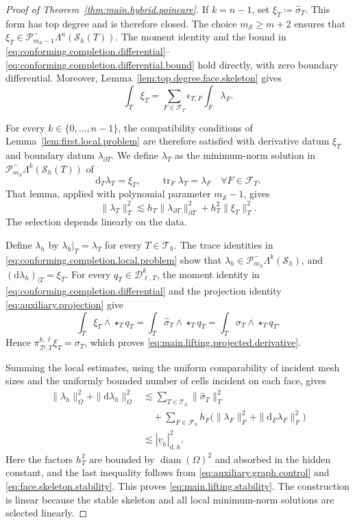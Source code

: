 \documentclass[a4paper,11pt]{article}
\theoremstyle{definition}
\newcommand{\DIFF}{\mathrm{d}}
\newcommand{\Sh}{\mathcal{S}_h}
\newcommand{\PLtrim}[2]{\mathcal{P}_{#1}^{-}\Lambda^{#2}}
\newcommand{\Dpoly}[2]{\mathcal D_{\ell,#1}^{#2}}
\newcommand{\piD}[2]{\pi_{\mathcal D,#1}^{#2,\ell}}
\newcommand{\trc}{\operatorname{tr}}
\newcommand{\epsTF}{\epsilon_{T,F}}
\begin{document}
\begin{proof}[Proof of Theorem~\ref{thm:main.hybrid.poincare}]
If $k=n-1$, set $\xi_T\coloneqq\widehat\sigma_T$.
This form has top degree and is therefore closed.
The choice $m_{\mathcal S}\geq m+2$ ensures that $\xi_T\in\PLtrim{m_{\mathcal S}-1}{n}(\Sh(T))$.
The moment identity and the bound in \eqref{eq:conforming.completion.differential}--\eqref{eq:conforming.completion.differential.bound} hold directly, with zero boundary differential.
Moreover, Lemma~\ref{lem:top.degree.face.skeleton} gives
\[
  \int_T\xi_T
  =
  \sum_{F\in\mathcal F_T}\epsTF\int_F\lambda_F.
\]

For every $k\in\{0,\ldots,n-1\}$, the compatibility conditions of Lemma~\ref{lem:first.local.problem} are therefore satisfied with derivative datum $\xi_T$ and boundary datum $\lambda_{\partial T}$.
We define $\lambda_T$ as the minimum-norm solution in $\PLtrim{m_{\mathcal S}}{k}(\Sh(T))$ of
\begin{equation}\label{eq:conforming.completion.local.problem}
  \DIFF_T\lambda_T=\xi_T,
  \qquad
  \trc_F\lambda_T=\lambda_F
  \quad\forall F\in\mathcal F_T.
\end{equation}
That lemma, applied with polynomial parameter $m_{\mathcal S}-1$, gives
\[
  \|\lambda_T\|_T^2
  \lesssim
  h_T\|\lambda_{\partial T}\|_{\partial T}^2
  +
  h_T^2\|\xi_T\|_T^2.
\]
The selection depends linearly on the data.

Define $\lambda_h$ by $\left.\lambda_h\right|_T=\lambda_T$ for every $T\in\mathcal T_h$.
The trace identities in \eqref{eq:conforming.completion.local.problem} show that $\lambda_h\in \PLtrim{m_{\mathcal S}}{k}(\Sh)$, and $(\DIFF\lambda_h)_{|T}=\xi_T$.
For every $q_T\in\Dpoly{T}{k}$, the moment identity in \eqref{eq:conforming.completion.differential} and the projection identity \eqref{eq:auxiliary.projection} give
\[
  \int_T\xi_T\wedge\star_Tq_T
  =
  \int_T\widehat\sigma_T\wedge\star_Tq_T
  =
  \int_T\sigma_T\wedge\star_Tq_T.
\]
Hence $\piD{T}{k}\xi_T=\sigma_T$, which proves \eqref{eq:main.lifting.projected.derivative}.

Summing the local estimates, using the uniform comparability of incident mesh sizes and the uniformly bounded number of cells incident on each face, gives
\[
\begin{aligned}
  \|\lambda_h\|_\Omega^2+\|\DIFF\lambda_h\|_\Omega^2
  &\lesssim
  \sum_{T\in\mathcal T_h}\|\widehat\sigma_T\|_T^2
  \\
  &\quad+
  \sum_{F\in\mathcal F_h}
  h_F\bigl(\|\lambda_F\|_F^2+\|\DIFF_F\lambda_F\|_F^2\bigr)
  \\
  &\lesssim
  |\underline v_h|_{\DIFF,h}^2.
\end{aligned}
\]
Here the factors $h_T^2$ are bounded by $\operatorname{diam}(\Omega)^2$ and absorbed in the hidden constant, and the last inequality follows from \eqref{eq:auxiliary.graph.control} and \eqref{eq:face.skeleton.stability}.
This proves \eqref{eq:main.lifting.stability}.
The construction is linear because the stable skeleton and all local minimum-norm solutions are selected linearly.
\end{proof}
\end{document}
